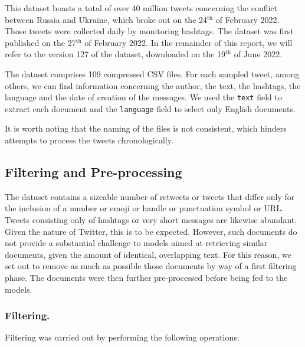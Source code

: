 \documentclass[runningheads]{llncs}
\begin{document}
This dataset boasts a total of over 40 million tweets concerning the conflict between Russia and Ukraine, which broke out on the 24$^{\text{th}}$ of February 2022. Those tweets were collected daily by monitoring hashtags. The dataset was first published on the 27$^{\text{th}}$ of February 2022. In the remainder of this report, we will refer to the version 127 of the dataset, downloaded on the 19$^{\text{th}}$ of June 2022. 

The dataset comprises 109 compressed CSV files. For each sampled tweet, among others, we can find information concerning the author, the text, the hashtags, the language and the date of creation of the messages. We used the \texttt{text} field to extract each document and the \texttt{language} field to select only English documents. 

It is worth noting that the naming of the files is not consistent, which hinders attempts to process the tweets chronologically.

\subsection{Filtering and Pre-processing}
\label{subsec:dataset:preprocessing}

The dataset contains a sizeable number of retweets or tweets that differ only for the inclusion of a number or emoji or handle or punctuation symbol or URL. Tweets consisting only of hashtags or very short messages are likewise abundant. Given the nature of Twitter, this is to be expected. However, such documents do not provide a substantial challenge to models aimed at retrieving similar documents, given the amount of identical, overlapping text. For this reason, we set out to remove as much as possible those documents by way of a first filtering phase. The documents were then further pre-processed before being fed to the models.

\subsubsection{Filtering.} Filtering was carried out by performing the following operations: 
\end{document}

